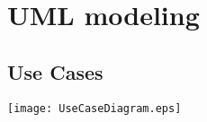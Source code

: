 \pagebreak
\section{UML modeling}
\subsection{Use Cases}

\texttt{[image: UseCaseDiagram.eps]}

\newtoggle{exception}
\newenvironment{UseCase}[5]{
	\paragraph{Partecipating actors:} #1
	\paragraph{Entry condition:} #2
	\paragraph{Flow of events:}
	\begin{itemize} 
		#3 
	\end{itemize}
	\paragraph{Exit condition:} #4
	\iftoggle{exception}{
		\paragraph{Exceptions:}
		\begin{itemize}
			#5
		\end{itemize}
	}{
	}
}{}

\newcommand{\Event}[1]{
	\item #1
}

\newcommand{\Exc}[2]{
	\item \textbf{#1:} #2
	
}


